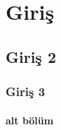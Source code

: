 \chapter{Giriş}
\lipsum
\section{Giriş 2}
\lipsum 
\subsection{Giriş 3}
\lipsum[1-3]
\subsubsection{alt bölüm}